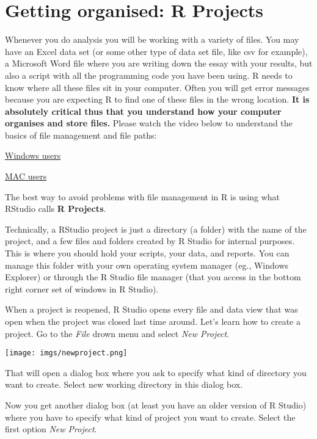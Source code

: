 \documentclass[
]{book}
\begin{document}
\section{Getting organised: R Projects}\label{getting-organised-r-projects}

Whenever you do analysis you will be working with a variety of files. You may have an Excel data set (or some other type of data set file, like csv for example), a Microsoft Word file where you are writing down the essay with your results, but also a script with all the programming code you have been using. R needs to know where all these files sit in your computer. Often you will get error messages because you are expecting R to find one of these files in the wrong location. \textbf{It is absolutely critical thus that you understand how your computer organises and store files.} Please watch the video below to understand the basics of file management and file paths:

\href{https://www.youtube.com/watch?v=k-EID5_2D9U}{Windows users}

\href{https://www.switchingtomac.com/tutorials/osx/5-ways-to-reveal-the-path-of-a-file-on-macos/}{MAC users}

The best way to avoid problems with file management in R is using what RStudio calls \textbf{R Projects}.

Technically, a RStudio project is just a directory (a folder) with the name of the project, and a few files and folders created by R Studio for internal purposes. This is where you should hold your scripts, your data, and reports. You can manage this folder with your own operating system manager (eg., Windows Explorer) or through the R Studio file manager (that you access in the bottom right corner set of windows in R Studio).

When a project is reopened, R Studio opens every file and data view that was open when the project was closed last time around. Let's learn how to create a project. Go to the \emph{File} drown menu and select \emph{New Project}.

\texttt{[image: imgs/newproject.png]}

That will open a dialog box where you ask to specify what kind of directory you want to create. Select new working directory in this dialog box.

Now you get another dialog box (at least you have an older version of R Studio) where you have to specify what kind of project you want to create. Select the first option \emph{New Project}.
\end{document}
